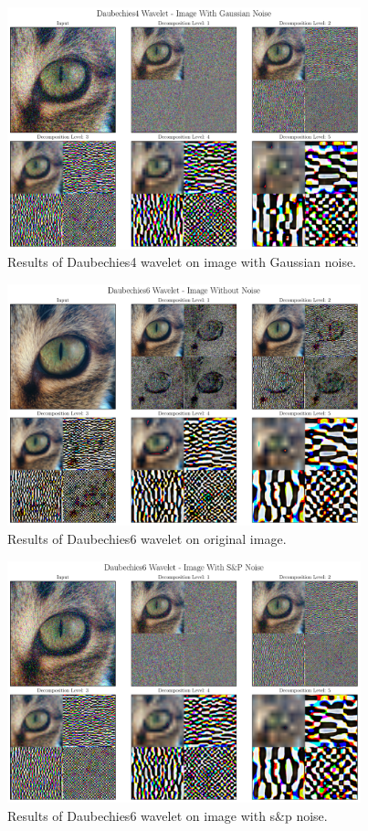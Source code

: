 \documentclass[12pt]{article}
\begin{document}
	\begin{figure}[!h]
		\centering
		\includegraphics[height=7cm]{../Tests/Outputs/2D_Daubechies4Wavelet_GaussianNoise.pdf}
		\caption{Results of Daubechies4 wavelet on image with Gaussian noise.}
		\label{fig:2d_db4_gs}
	\end{figure}
	
	\begin{figure}[!h]
		\centering
		\includegraphics[height=7cm]{../Tests/Outputs/2D_Daubechies6Wavelet_WithoutNoise.pdf}
		\caption{Results of Daubechies6 wavelet on original image.}
		\label{fig:2d_db6}
	\end{figure}
	
	\begin{figure}[!h]
		\centering
		\includegraphics[height=7cm]{../Tests/Outputs/2D_Daubechies6Wavelet_SPNoise.pdf}
		\caption{Results of Daubechies6 wavelet on image with s\&p noise.}
		\label{fig:2d_db6_sp}
	\end{figure}
	
\end{document}
